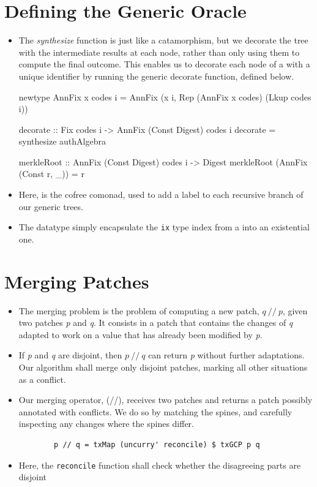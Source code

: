 \section{Defining the Generic Oracle}
\begin{itemize}
    \item  The \textit{synthesize} function is just like a catamorphism, but we decorate the tree with the intermediate results at each node, rather than only using them to compute the final outcome. This enables us to decorate each node of a  with a unique identifier by running the generic decorate function, defined below.
    \begin{haskell}
        newtype AnnFix x codes i 
            = AnnFix (x i, Rep (AnnFix x codes) (Lkup codes i))

        decorate :: Fix codes i -> AnnFix (Const Digest) codes i
        decorate = synthesize authAlgebra

        merkleRoot :: AnnFix (Const Digest) codes i -> Digest
        merkleRoot (AnnFix (Const r, _)) = r
    \end{haskell}
    \item Here,  is the cofree comonad, used to add a label to each recursive branch of our generic trees.
    \item The  datatype simply encapsulate the \texttt{ix} type index from a  into an existential one.
\end{itemize}

\section{Merging Patches}
\begin{itemize}
    \item The merging problem is the problem of computing a new patch, $q \: // \: p$, given two patches \textit{p} and \textit{q}. It consists in a patch that contains the changes of \textit{q} adapted to work on a value that has already been modified by \textit{p}.
    \item If \textit{p} and \textit{q} are disjoint, then $p \: // \: q$ can return \textit{p} without further adaptations. Our algorithm shall merge only disjoint patches, marking all other situations as a conflict.
    \item Our merging operator, (//), receives two patches and returns a patch possibly annotated with conflicts. We do so by matching the spines, and carefully inspecting any changes where the spines differ.
    \begin{verbatim}
        p // q = txMap (uncurry' reconcile) $ txGCP p q
    \end{verbatim}
    \item Here, the \texttt{reconcile} function shall check whether the disagreeing parts are disjoint
\end{itemize}

